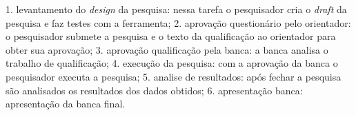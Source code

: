 \begin{flushright}
	\begin{minipage}{.96\textwidth}
		\label{ela-pro} 1.  levantamento do \textit{design} da pesquisa: nessa tarefa o pesquisador cria o \textit{draft} da pesquisa e faz testes com a ferramenta; \newline
		\label{anI} 2.  aprovação questionário pelo orientador:	o pesquisador submete a pesquisa e o texto da qualificação ao orientador para obter sua aprovação; \newline
		\label{anII} 3.  aprovação qualificação pela banca:	a banca analisa o trabalho de qualificação;
		\label{anIII} 4.  execução da pesquisa:  com a aprovação da banca o pesquisador executa a pesquisa; \newline
		\label{dI} 5.  analise de resultados: após fechar a pesquisa são analisados os resultados dos dados obtidos; \newline
		\label{dII} 6.  apresentação banca: apresentação da banca final.
	\end{minipage}
\end{flushright}


